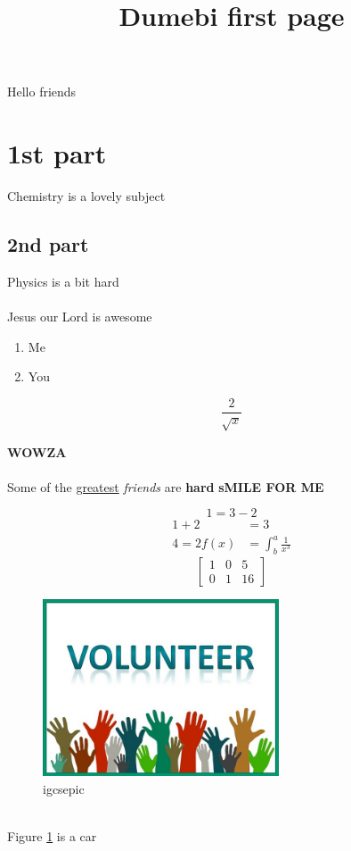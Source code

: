 \documentclass[landscape]{article}
\begin{document}
	\title{Dumebi first page}
	Hello friends
	\section{1st part}
		Chemistry is a lovely subject
		\subsection{2nd part}
			Physics is a bit hard
			
			\paragraph{}
				Jesus our Lord is awesome
				
				\begin{enumerate}
					\item Me
					\item You
				\end{enumerate}
			
			\begin{equation}
				\frac{2}{\sqrt{x}}
			\end{equation}
	
	\textbf{WOWZA}
	\paragraph{}
		Some of the \underline{greatest} \emph{friends} are \textbf{hard} \textbf{sMILE FOR ME}
		
		\newpage
		
		\begin{equation*}
			1= 3 - 2
		\end{equation*}
		\begin{align*}
			1+2 &=3\\
			4=2
			f(x) &= \int^a_b
			\frac{1}{x^3}			
		\end{align*}
	\begin{equation*}
		\left[
		\begin{matrix}
			1 & 0 & 5\\ 0 & 1 & 16
		\end{matrix}
			\right]
	\end{equation*}
	\begin{figure}[h!]
		\includegraphics[width= 7cm]{J218VOLUNTEER.jpg}
		\caption{igcsepic}
		\label{fig: volunteer}
		
	\end{figure}\\
	Figure \ref{fig: volunteer} is a car
	
\end{document}

